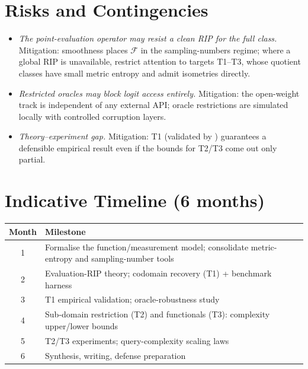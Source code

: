 \documentclass[11pt,a4paper]{article}
\theoremstyle{definition}
\newcommand{\Fclass}{\mathcal{F}}
\begin{document}
\section{Risks and Contingencies}

\begin{itemize}[leftmargin=*]
  \item \emph{The point-evaluation operator may resist a clean RIP for the full
  class.} Mitigation: smoothness places $\Fclass$ in the sampling-numbers regime;
  where a global RIP is unavailable, restrict attention to targets T1--T3, whose
  quotient classes have small metric entropy and admit isometries directly.
  \item \emph{Restricted oracles may block logit access entirely.} Mitigation: the
  open-weight track is independent of any external API; oracle restrictions are
  simulated locally with controlled corruption layers.
  \item \emph{Theory--experiment gap.} Mitigation: T1 (validated by
  \citet{carlini2024stealing}) guarantees a defensible empirical result even if
  the bounds for T2/T3 come out only partial.
\end{itemize}

\section{Indicative Timeline (6 months)}

\begin{center}
\begin{tabular}{cl}
\toprule
\textbf{Month} & \textbf{Milestone}\\
\midrule
1 & Formalise the function/measurement model; consolidate metric-entropy and sampling-number tools\\
2 & Evaluation-RIP theory; codomain recovery (T1) + benchmark harness\\
3 & T1 empirical validation; oracle-robustness study\\
4 & Sub-domain restriction (T2) and functionals (T3): complexity upper/lower bounds\\
5 & T2/T3 experiments; query-complexity scaling laws\\
6 & Synthesis, writing, defense preparation\\
\bottomrule
\end{tabular}
\end{center}
\end{document}
